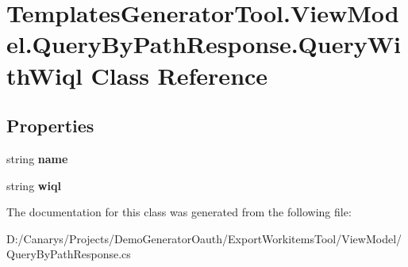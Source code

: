 \hypertarget{class_templates_generator_tool_1_1_view_model_1_1_query_by_path_response_1_1_query_with_wiql}{}\section{Templates\+Generator\+Tool.\+View\+Model.\+Query\+By\+Path\+Response.\+Query\+With\+Wiql Class Reference}
\label{class_templates_generator_tool_1_1_view_model_1_1_query_by_path_response_1_1_query_with_wiql}
\subsection*{Properties}
\begin{DoxyCompactItemize}
\item 
\mbox{\label{class_templates_generator_tool_1_1_view_model_1_1_query_by_path_response_1_1_query_with_wiql_a87cafeb4afdb3bf3a7d3ae42536710d2}} 
string {\bfseries name}
\item 
\mbox{\label{class_templates_generator_tool_1_1_view_model_1_1_query_by_path_response_1_1_query_with_wiql_a19069a73ed969c95fd26ff070abe0f68}} 
string {\bfseries wiql}
\end{DoxyCompactItemize}


The documentation for this class was generated from the following file\+:\begin{DoxyCompactItemize}
\item 
D\+:/\+Canarys/\+Projects/\+Demo\+Generator\+Oauth/\+Export\+Workitems\+Tool/\+View\+Model/Query\+By\+Path\+Response.\+cs\end{DoxyCompactItemize}
